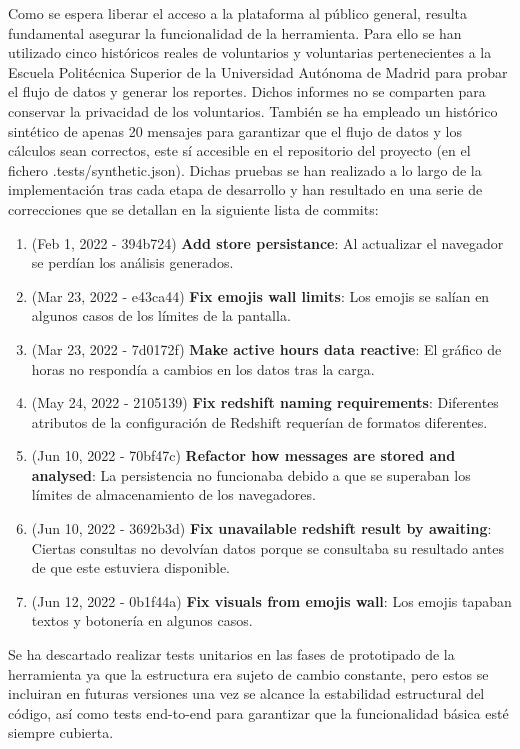 
Como se espera liberar el acceso a la plataforma al público general, resulta fundamental asegurar la funcionalidad de la herramienta. Para ello se han utilizado cinco históricos reales de voluntarios y voluntarias pertenecientes a la Escuela Politécnica Superior de la Universidad Autónoma de Madrid para probar el flujo de datos y generar los reportes. Dichos informes no se comparten para conservar la privacidad de los voluntarios. También se ha empleado un histórico sintético de apenas 20 mensajes para garantizar que el flujo de datos y los cálculos sean correctos, este sí accesible en el repositorio del proyecto\cite{Repositorio} (en el fichero .tests/synthetic.json). Dichas pruebas se han realizado a lo largo de la implementación tras cada etapa de desarrollo y han resultado en una serie de correcciones que se detallan en la siguiente lista de commits:

\begin{enumerate}
    \item (Feb 1, 2022 - 394b724) \textbf{Add store persistance}: Al actualizar el navegador se perdían los análisis generados.
    \item (Mar 23, 2022 - e43ca44) \textbf{Fix emojis wall limits}: Los emojis se salían en algunos casos de los límites de la pantalla. 
    \item (Mar 23, 2022 - 7d0172f) \textbf{Make active hours data reactive}: El gráfico de horas no respondía a cambios en los datos tras la carga. 
    \item (May 24, 2022 - 2105139) \textbf{Fix redshift naming requirements}: Diferentes atributos de la configuración de Redshift requerían de formatos diferentes.
    \item (Jun 10, 2022 - 70bf47c) \textbf{Refactor how messages are stored and analysed}: La persistencia no funcionaba debido a que se superaban los límites de almacenamiento de los navegadores.
    \item (Jun 10, 2022 - 3692b3d) \textbf{Fix unavailable redshift result by awaiting}: Ciertas consultas no devolvían datos porque se consultaba su resultado antes de que este estuviera disponible.
    \item (Jun 12, 2022 - 0b1f44a) \textbf{Fix visuals from emojis wall}: Los emojis tapaban textos y botonería en algunos casos.
\end{enumerate}

Se ha descartado realizar tests unitarios en las fases de prototipado de la herramienta ya que la estructura era sujeto de cambio constante, pero estos se incluiran en futuras versiones una vez se alcance la estabilidad estructural del código, así como tests end-to-end para garantizar que la funcionalidad básica esté siempre cubierta.
